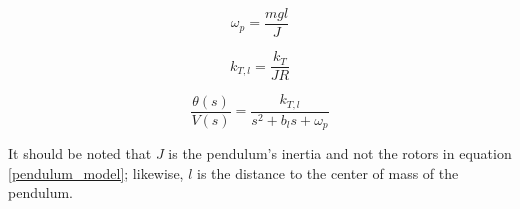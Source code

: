 \begin{equation}
\label{lumped_wp}
\omega_p = \frac{mgl}{J}
\end{equation}

\begin{equation}
\label{lumped_kt}
k_{T,l} = \frac{k_T}{JR}
\end{equation}

\begin{equation}
\label{pendulum_model}
\frac{\theta(s)}{V(s)} = \frac{k_{T,l}}{s^2 + b_ls + \omega_p}
\end{equation}

It should be noted that $J$ is the pendulum's inertia and not the rotors in equation \ref{pendulum_model}; likewise, $l$ is the distance to the center of mass of the pendulum.
